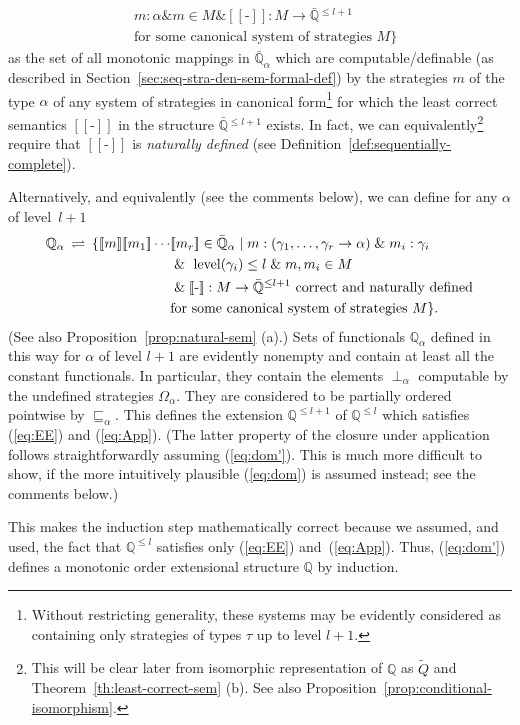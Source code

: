 \documentclass[fleqn]{LMCS}
\theoremstyle{plain}\newtheorem{satz}[thm]{Satz}
\theoremstyle{plain}\newtheorem{hyp}[thm]{Hypothesis}
\theoremstyle{plain}\newtheorem{hyps}[thm]{Hypotheses}
\theoremstyle{definition}\newtheorem{note}[thm]{Note}
\newcommand{\defis}{\mbox{-}}
\newcommand{\bYdef}{\mathrel{\BYDEF}}
\newcommand{\BYDEF}{\mbox{$\hspace{.2em}\rightleftharpoons\hspace{.2em}$}}
\newcommand{\arr}{\rightarrow}
\newcommand{\Dsem}[1]{[\![ #1 ]\!]}
\newcommand{\AND}{\mathrel{\&}}
\newcommand{\bbQ}{\mathbb{Q}}
\newcommand{\Undef}{{\perp}}
\newcommand{\tQ}{\tilde{Q}}
\newcommand{\sqle}{\sqsubseteq}
\newcommand{\?}{\mbox{?}}
\begin{document}
\begin{defi}
\begin{align}
&m:\alpha\AND m\in M
 \AND\Dsem{\defis}:M\arr\bar{\bbQ}{}^{\le l+1}
\nonumber
\\
&\mbox{for some canonical system of strategies }M\}\label{eq:dom}
\end{align}
as the set of all monotonic 
mappings in $\bar{\bbQ}_\alpha$ which are computable/definable 
(as described in Section~\ref{sec:seq-stra-den-sem-formal-def}) 
by the strategies $m$ of the type
$\alpha$ of any system of strategies in canonical form\footnote{Without restricting generality, these systems 
may be evidently considered as 
containing only strategies of types $\tau$ up to level $l+1$.
}
for which 
the least correct semantics 
$\Dsem{\defis}$ 
in the structure $\bar{\bbQ}{}^{\le l+1}$ exists. 
In fact, we can equivalently\footnote{This will be clear later from isomorphic representation of 
$\bbQ$ as $\tQ$ and Theorem~\ref{th:least-correct-sem} (b). See also 
Proposition~\ref{prop:conditional-isomorphism}. 
}
require that $\Dsem{\defis}$ is \emph{naturally defined} 
(see Definition~\ref{def:sequentially-complete}). 

Alternatively, and equivalently (see the comments below), we can define 
for any $\alpha$ of level~\mbox{$l+1$}
\begin{align}
\bbQ_{\alpha}\bYdef\{\Dsem{m}\Dsem{m_1}\cdots&\Dsem{m_r}\in\bar{\bbQ}_{\alpha} 
\mid  m:(\gamma_1,\ldots,\gamma_r\arr\alpha) \AND m_i:\gamma_i
\nonumber
\\
&\AND \textrm{ level}(\gamma_i)\le l
 \AND m,m_i\in M
\nonumber
\\
&\AND\Dsem{\defis}:M\arr\bar{\bbQ}{}^{\le l+1}
\textrm{ correct and naturally defined}
\nonumber
\\
&\mbox{for some canonical system of strategies }M\}.\label{eq:dom'}
\end{align}
(See also Proposition~\ref{prop:natural-sem} (a).)
Sets of functionals $\bbQ_{\alpha}$ defined in this way 
for $\alpha$ of level $l+1$ are evidently nonempty and contain at least 
all the constant functionals. In particular, they contain 
the elements $\Undef_{\alpha}$ computable 
by the undefined strategies $\Omega_{\alpha}$. 
They are considered to be
partially ordered pointwise by $\sqle_{\alpha}$. 
This defines the extension $\bbQ^{\le l+1}$ of $\bbQ^{\le l}$ 
which satisfies (\ref{eq:EE}) and (\ref{eq:App}). 
(The latter property of the closure under application 
follows straightforwardly assuming (\ref{eq:dom'}).  
This is much more difficult to show, if the more intuitively plausible (\ref{eq:dom}) 
is assumed instead; see the comments below.)
 
This makes the induction step mathematically correct because we 
assumed, and used, the fact that $\bbQ^{\le l}$ satisfies only 
(\ref{eq:EE}) and~(\ref{eq:App}). 
Thus, (\ref{eq:dom'}) defines a monotonic order extensional structure $\bbQ$ by induction. 
\end{defi}
\end{document}
